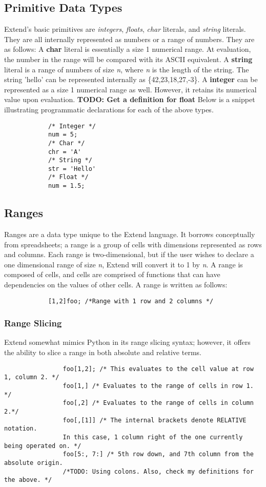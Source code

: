 \documentclass[titlepage]{article}
\begin{document}
	\subsection{Primitive Data Types}
		Extend's basic primitives are \textit{integers}, \textit{floats}, \textit{char} literals, and \textit{string} literals. They are all internally represented as numbers or a range of numbers. They are as follows:
		\newline
		A \textbf{char} literal is essentially a size 1 numerical range. At evaluation, the number in the range will be compared with its ASCII equivalent.
  		\newline
  		A \textbf{string} literal is a range of numbers of size \textit{n}, where \textit{n} is the length of the string. The string 'hello' can be represented internally as \{42,23,18,27,-3\}.
		A \textbf{integer} can be represented as a size 1 numerical range as well. However, it retains its numerical value upon evaluation. 
		\newline
		\textbf{TODO: Get a definition for float }
		\newline
		Below is a snippet illustrating programmatic declarations for each of the above types.
  		\begin{lstlisting}
			/* Integer */
			num = 5;
			/* Char */
			chr = 'A'
			/* String */
			str = 'Hello'
			/* Float */
			num = 1.5;
  		\end{lstlisting}
	\subsection{Ranges}
		Ranges are a data type unique to the Extend language. It borrows conceptually from spreadsheets; a range is a group of cells with dimensions represented as rows and columns. Each range is two-dimensional, but if the user wishes to declare a one dimensional range of size \textit{n}, Extend will convert it to 1 by \textit{n}. A range is composed of cells, and cells are comprised of functions that can have dependencies on the values of other cells. 
		A range is written as follows:
		\begin{lstlisting}
			[1,2]foo; /*Range with 1 row and 2 columns */
		\end{lstlisting}
		\subsubsection{Range Slicing}
			Extend somewhat mimics Python in its range slicing syntax; however, it offers the ability to slice a range in both absolute and relative terms.
			\begin{lstlisting}
				foo[1,2]; /* This evaluates to the cell value at row 1, column 2. */
				foo[1,] /* Evaluates to the range of cells in row 1. */
				foo[,2] /* Evaluates to the range of cells in column 2.*/
				foo[,[1]] /* The internal brackets denote RELATIVE notation. 
				In this case, 1 column right of the one currently being operated on. */ 
				foo[5:, 7:] /* 5th row down, and 7th column from the absolute origin.
				/*TODO: Using colons. Also, check my definitions for the above. */
			\end{lstlisting}
\end{document}
